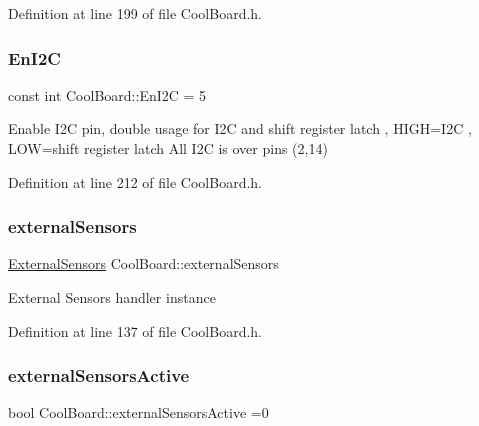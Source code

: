 Definition at line 199 of file Cool\+Board.\+h.

\mbox{\label{class_cool_board_af1fe1376fc66f93dee80b327ca695377}} 
\subsubsection{\texorpdfstring{En\+I2C}{EnI2C}}
{\footnotesize\ttfamily const int Cool\+Board\+::\+En\+I2C = 5\hspace{0.3cm}{\ttfamily [private]}}

Enable I2C pin, double usage for I2C and shift register latch , H\+I\+GH=I2C , L\+OW=shift register latch All I2C is over pins (2,14) 

Definition at line 212 of file Cool\+Board.\+h.

\mbox{\label{class_cool_board_a09e26264839c65873eb56af476eff6b2}} 
\subsubsection{\texorpdfstring{external\+Sensors}{externalSensors}}
{\footnotesize\ttfamily \hyperlink{class_external_sensors}{External\+Sensors} Cool\+Board\+::external\+Sensors\hspace{0.3cm}{\ttfamily [private]}}

External Sensors handler instance 

Definition at line 137 of file Cool\+Board.\+h.

\mbox{\label{class_cool_board_a638b00b76aeb819ecfd4c10b8cdd7bb7}} 
\subsubsection{\texorpdfstring{external\+Sensors\+Active}{externalSensorsActive}}
{\footnotesize\ttfamily bool Cool\+Board\+::external\+Sensors\+Active =0\hspace{0.3cm}{\ttfamily [private]}}

